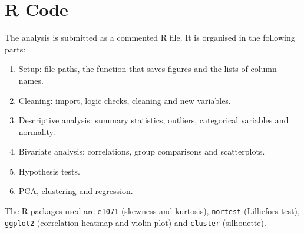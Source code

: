 \documentclass[11pt,a4paper]{article}
\begin{document}
\section{R Code}
The analysis is submitted as a commented R file. It is organised in the following parts:
\begin{enumerate}
	\item Setup: file paths, the function that saves figures and the lists of column names.
	\item Cleaning: import, logic checks, cleaning and new variables.
	\item Descriptive analysis: summary statistics, outliers, categorical variables and normality.
	\item Bivariate analysis: correlations, group comparisons and scatterplots.
	\item Hypothesis tests.
	\item PCA, clustering and regression.
\end{enumerate}
The R packages used are \texttt{e1071} (skewness and kurtosis), \texttt{nortest} (Lilliefors test), \texttt{ggplot2} (correlation heatmap and violin plot) and \texttt{cluster} (silhouette).
\end{document}
